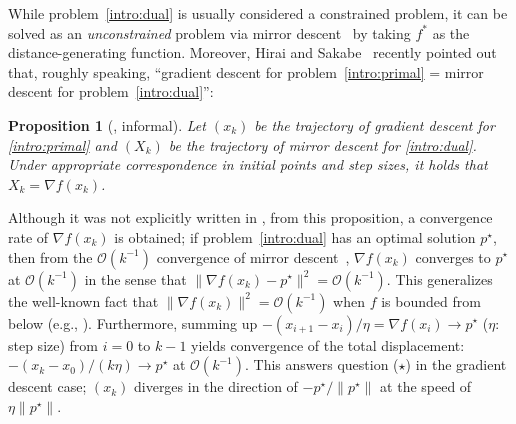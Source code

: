 \documentclass[11pt,a4paper]{article}
\theoremstyle{definition}
\theoremstyle{plain}
\newtheorem{prop}[prop]{Proposition}
\begin{document}
While problem~\eqref{intro:dual} is usually considered a constrained problem, it can be solved as an \textit{unconstrained} problem via mirror descent~\cite{NY1983} by taking $f^\ast$ as the distance-generating function.
Moreover, Hirai and Sakabe~\cite{HS2024} recently pointed out that, roughly speaking, ``gradient descent for problem~\eqref{intro:primal} = mirror descent for problem~\eqref{intro:dual}'':
\begin{prop}[\cite{HS2024}, informal]
    Let $(x_k)$ be the trajectory of gradient descent for \eqref{intro:primal} and $(X_k)$ be the trajectory of mirror descent for \eqref{intro:dual}.
    Under appropriate correspondence in initial points and step sizes, it holds that $X_k = \nabla f(x_k)$.
\end{prop}
Although it was not explicitly written in \cite{HS2024}, from this proposition, a convergence rate of $\nabla f(x_k)$ is obtained;
if problem~\eqref{intro:dual} has an optimal solution $p^\star$, then from the $\mathcal{O}(k^{-1})$ convergence of mirror descent~\cite{BBT2017, LFN2018}, $\nabla f(x_k)$ converges to $p^\star$ at $\mathcal{O}(k^{-1})$ in the sense that $\|\nabla f(x_k) - p^\star\|^2 = \mathcal{O}(k^{-1})$.
This generalizes the well-known fact that $\|\nabla f(x_k)\|^2 = \mathcal{O}(k^{-1})$ when $f$ is bounded from below (e.g., \cite[(1.2.22)]{Nesterov2018}).
Furthermore, summing up $-(x_{i + 1} - x_i)/\eta = \nabla f(x_i) \to p^\star$ ($\eta$: step size) from $i = 0$ to $k - 1$ yields convergence of the total displacement: $-(x_k - x_0)/(k\eta) \to p^\star$ at $\mathcal{O}(k^{-1})$.
This answers question ($\star$) in the gradient descent case; $(x_k)$ diverges in the direction of $-p^\star/\|p^\star\|$ at the speed of $\eta\|p^\star\|$.
\end{document}
